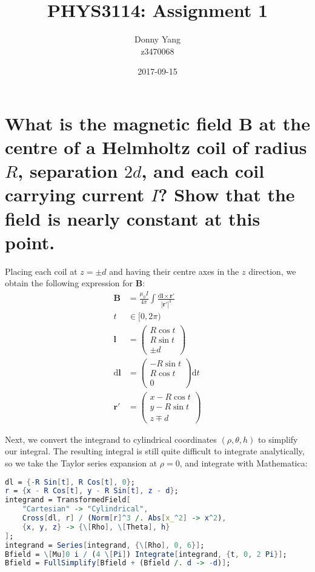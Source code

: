 \documentclass[a4paper]{scrartcl}
\begin{document}
\title{PHYS3114: Assignment 1}
\author{Donny Yang \\ z3470068}
\date{2017-09-15}
\maketitle

\section{What is the magnetic field \(\mathbf{B}\) at the centre of a Helmholtz coil of radius \(R\), separation \(2 d\), and each coil carrying current \(I\)? Show that the field is nearly constant at this point.}
Placing each coil at \(z = \pm d\) and having their centre axes in the \(z\) direction, we obtain the following expression for \(\mathbf{B}\):
\begin{align*}
    \mathbf{B} &= \frac{\mu_0 I}{4 \pi} \int \frac{\mathrm{d}\mathbf{l} \times \mathbf{r}'}{|\mathbf{r}'|^3} \\
    t &\in [0, 2 \pi) \\
    \mathbf{l} &= \begin{pmatrix}R \cos t \\ R \sin t \\ \pm d\end{pmatrix} \\
    \mathrm{d}\mathbf{l} &= \begin{pmatrix}-R \sin t \\ R \cos t \\ 0\end{pmatrix} \mathrm{d} t \\
    \mathbf{r'} &= \begin{pmatrix}x - R \cos t \\ y - R \sin t \\ z \mp d\end{pmatrix}
\end{align*}

Next, we convert the integrand to cylindrical coordinates \((\rho, \theta, h)\) to simplify our integral. The resulting integral is still quite difficult to integrate analytically, so we take the Taylor series expansion at \(\rho = 0\), and integrate with Mathematica:
\begin{lstlisting}[language = Mathematica, frame = single]
dl = {-R Sin[t], R Cos[t], 0};
r = {x - R Cos[t], y - R Sin[t], z - d};
integrand = TransformedField[
    "Cartesian" -> "Cylindrical",
    Cross[dl, r] / (Norm[r]^3 /. Abs[x_^2] -> x^2),
    {x, y, z} -> {\[Rho], \[Theta], h}
];
integrand = Series[integrand, {\[Rho], 0, 6}];
Bfield = \[Mu]0 i / (4 \[Pi]) Integrate[integrand, {t, 0, 2 Pi}];
Bfield = FullSimplify[Bfield + (Bfield /. d -> -d)];
\end{lstlisting}
\end{document}
